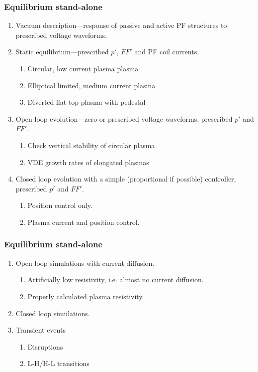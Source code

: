 \subsubsection{Equilibrium stand-alone}
\begin{enumerate}
	\item Vacuum description---response of passive and active PF structures to prescribed voltage waveforms.
	\item Static equilibrium---prescribed $p'$, $FF'$ and PF coil currents.
	\begin{enumerate}
		\item Circular, low current plasma plasma
		\item Elliptical limited, medium current plasma
		\item Diverted flat-top plasma with pedestal
	\end{enumerate}
	\item Open loop evolution---zero or prescribed voltage waveforms, prescribed $p'$ and $FF'$.
	\begin{enumerate}
		\item Check vertical stability of circular plasma
		\item VDE growth rates of elongated plasmas
	\end{enumerate}
	\item Closed loop evolution with a simple (proportional if possible) controller, prescribed $p'$ and $FF'$.
	\begin{enumerate}
		\item Position control only.
		\item Plasma current and position control.
	\end{enumerate}
\end{enumerate}

\subsubsection{Equilibrium stand-alone}
\begin{enumerate}
	\item Open loop simulations with current diffusion.
	\begin{enumerate}
		\item Artificially low resistivity, i.e. almost no current diffusion.
		\item Properly calculated plasma resistivity.
	\end{enumerate}
	\item Closed loop simulations.
	\item Transient events
	\begin{enumerate}
		\item Disruptions
		\item L-H/H-L transitions
	\end{enumerate}
\end{enumerate}


